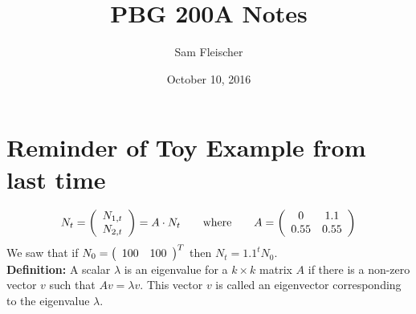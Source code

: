 \documentclass{article}
\title{PBG 200A Notes}
\author{Sam Fleischer}
\date{October 10, 2016}
\begin{document}
    \maketitle

    \section{Reminder of Toy Example from last time}
        \begin{align}
            N_t = \qty(\begin{array}{cc}
                N_{1,t} \\ N_{2,t}
            \end{array}) = A\cdot N_t \qquad \text{where} \qquad A = \qty(\begin{array}{cc}
                0 & 1.1 \\ 0.55 & 0.55
            \end{array})
        \end{align}
        We saw that if $N_0 = \qty(\begin{array}{cc} 100 & 100 \end{array})^T$ then $N_t = 1.1^t N_0$. \\

        \textbf{Definition: }A scalar $\lambda$ is an eigenvalue for a $k\times k$ matrix $A$ if there is a non-zero vector $v$ such that $Av = \lambda v$.  This vector $v$ is called an eigenvector corresponding to the eigenvalue $\lambda$.
\end{document}
